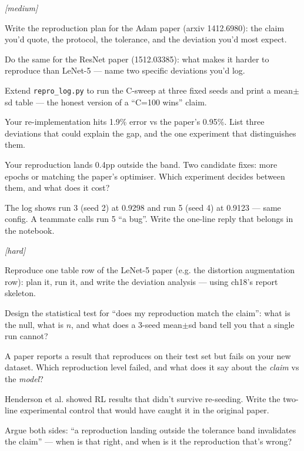 \emph{[medium]}
\begin{exercise}
Write the reproduction plan for the Adam paper
(arxiv 1412.6980): the claim you'd quote, the protocol, the
tolerance, and the deviation you'd most expect.
\end{exercise}
\begin{exercise}
Do the same for the ResNet paper (1512.03385): what makes it
harder to reproduce than LeNet-5 --- name two specific deviations
you'd log.
\end{exercise}
\begin{exercise}
Extend \texttt{repro\_log.py} to run the C-sweep at three fixed
seeds and print a mean$\pm$sd table --- the honest version of a
``C=100 wins'' claim.
\end{exercise}
\begin{exercise}
Your re-implementation hits 1.9\% error vs the paper's 0.95\%.
List three deviations that could explain the gap, and the one
experiment that distinguishes them.
\end{exercise}

\begin{exercise}
Your reproduction lands 0.4pp outside the band. Two candidate fixes:
more epochs or matching the paper's optimiser. Which experiment
decides between them, and what does it cost?
\end{exercise}
\begin{exercise}
The log shows run 3 (seed 2) at 0.9298 and run 5 (seed 4) at 0.9123
--- same config. A teammate calls run 5 ``a bug''. Write the one-line
reply that belongs in the notebook.
\end{exercise}

\emph{[hard]}
\begin{exercise}
Reproduce one table row of the LeNet-5 paper (e.g. the distortion
augmentation row): plan it, run it, and write the deviation
analysis --- using ch18's report skeleton.
\end{exercise}
\begin{exercise}
Design the statistical test for ``does my reproduction match the
claim'': what is the null, what is $n$, and what does a
3-seed mean$\pm$sd band tell you that a single run cannot?
\end{exercise}
\begin{exercise}
A paper reports a result that reproduces on their test set but
fails on your new dataset. Which reproduction level failed, and
what does it say about the \emph{claim} vs the \emph{model}?
\end{exercise}
\begin{exercise}
Henderson et al. showed RL results that didn't survive re-seeding.
Write the two-line experimental control that would have caught it
in the original paper.
\end{exercise}
\begin{exercise}
Argue both sides: ``a reproduction landing outside the tolerance
band invalidates the claim'' --- when is that right, and when is it
the reproduction that's wrong?
\end{exercise}

